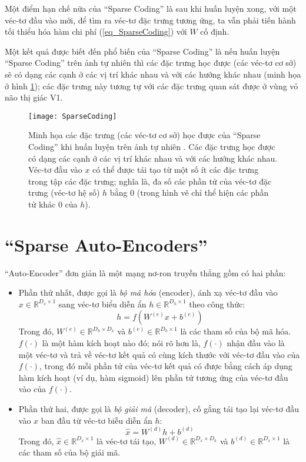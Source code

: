 Một điểm hạn chế nữa của ``Sparse Coding'' là sau khi huấn luyện xong, với một véc-tơ đầu vào mới, để tìm ra véc-tơ đặc trưng tương ứng, ta vẫn phải tiến hành tối thiểu hóa hàm chi phí (\ref{eq_SparseCoding}) với $W$ cố định.

Một kết quả được biết đến phổ biến của ``Sparse Coding'' là nếu huấn luyện ``Sparse Coding'' trên ảnh tự nhiên thì các đặc trưng học được (các véc-tơ cơ sở) sẽ có dạng các cạnh  ở các vị trí khác nhau và với các hướng khác nhau (minh họa ở hình \ref{fig_SparseCoding}); các đặc trưng này tương tự với các đặc trưng quan sát được ở vùng vỏ não thị giác V1. 

\begin{figure} 
	\centering
	\texttt{[image: SparseCoding]}
	\caption{Minh họa các đặc trưng (các véc-tơ cơ sở) học được của ``Sparse Coding'' khi huấn luyện trên ảnh tự nhiên \cite{zeiler2014thesis}. Các đặc trưng học được có dạng các cạnh ở các vị trí khác nhau và với các hướng khác nhau. Véc-tơ đầu vào $x$ có thể được tái tạo từ một số ít các đặc trưng trong tập các đặc trưng; nghĩa là, đa số các phần tử của véc-tơ đặc trưng (véc-tơ hệ số) $h$ bằng 0 (trong hình vẽ chỉ thể hiện các phần tử khác 0 của $h$).}
	\label{fig_SparseCoding}
\end{figure}
\section{``Sparse Auto-Encoders''}
``Auto-Encoder'' đơn giản là một mạng nơ-ron truyền thẳng gồm có hai phần: 
\begin{itemize}
	\item Phần thứ nhất, được gọi là \emph{bộ mã hóa} (encoder), ánh xạ véc-tơ đầu vào $x \in \mathbb{R}^{D_x \times 1}$ sang véc-tơ biểu diễn ẩn $h \in \mathbb{R}^{D_h \times 1}$ theo công thức: 
	\begin{equation}
		h=f(W^{(e)}x + b^{(e)})
	\end{equation}
	Trong đó, $W^{(e)} \in \mathbb{R}^{D_h \times D_x}$ và $b^{(e)} \in \mathbb{R}^{D_h \times 1}$ là các tham số của bộ mã hóa. $f(\cdot)$ là một hàm kích hoạt nào đó; nói rõ hơn là, $f(\cdot)$ nhận đầu vào là một véc-tơ và trả về véc-tơ kết quả có cùng kích thước với véc-tơ đầu vào của $f(\cdot)$, trong đó mỗi phần tử của véc-tơ kết quả có được bằng cách áp dụng hàm kích hoạt (ví dụ, hàm sigmoid) lên phần tử tương ứng của véc-tơ đầu vào của $f(\cdot)$.
	\item Phần thứ hai, được gọi là \emph{bộ giải mã} (decoder), cố gắng tái tạo lại véc-tơ đầu vào $x$ ban đầu từ véc-tơ biễu diễn ẩn $h$:
	\begin{equation}
		\hat{x} = W^{(d)}h + b^{(d)}
	\end{equation}
	Trong đó, $\hat{x} \in \mathbb{R}^{D_x \times 1}$ là véc-tơ tái tạo, $W^{(d)} \in \mathbb{R}^{D_x \times D_h}$ và $b^{(d)} \in \mathbb{R}^{D_x \times 1}$ là các tham số của bộ giải mã.
\end{itemize}

